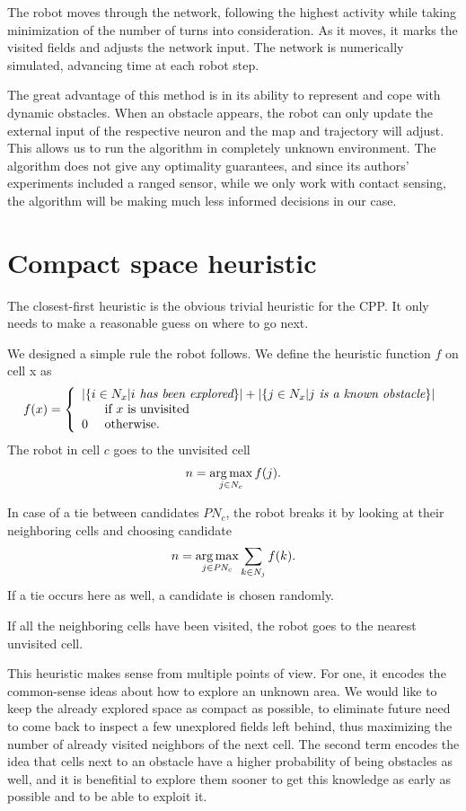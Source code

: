 \documentclass[buriama8_dp.tex]{subfiles}
\begin{document}
The robot moves through the network, following the highest activity while taking minimization of the number of turns into consideration. As it moves, it marks the visited fields and adjusts the network input. The network is numerically simulated, advancing time at each robot step.

The great advantage of this method is in its ability to represent and cope with dynamic obstacles. When an obstacle appears, the robot can only update the external input of the respective neuron and the map and trajectory will adjust. This allows us to run the algorithm in completely unknown environment. The algorithm does not give any optimality guarantees, and since its authors' experiments included a ranged sensor, while we only work with contact sensing, the algorithm will be making much less informed decisions in our case.

\section{Compact space heuristic}
\label{sec:my_heuristic}

The closest-first heuristic is the obvious trivial heuristic for the CPP. It only needs to make a reasonable guess on where to go next. 

We designed a simple rule the robot follows. We define the heuristic function \(f\) on cell \m x as 
\[
f(x)= \left\{
    \begin{array}{l}
      |\{i \in N_x | i \textit{ has been explored}\}| + |\{j \in N_x | j \textit{ is a known obstacle}\}| \\
      \hphantom{0} \quad \textrm{ if }x\textrm{ is unvisited} \\
      0 \quad \textrm{ otherwise.}
    \end{array}
    \right.
\]
The robot in cell \(c\) goes to the unvisited cell
\[n = \operatorname*{arg\,max}_{j \in N_c} f(j).\]

In case of a tie between candidates \(\textit{PN}_c\), the robot breaks it by looking at their neighboring cells and choosing candidate
\[
n = \operatorname*{arg\,max}_{j \in \textit{PN}_c} \sum_{k \in N_j} f(k).
\]
If a tie occurs here as well, a candidate is chosen randomly.

If all the neighboring cells have been visited, the robot goes to the nearest unvisited cell.

This heuristic makes sense from multiple points of view. For one, it encodes the common-sense ideas about how to explore an unknown area. We would like to keep the already explored space as compact as possible, to eliminate future need to come back to inspect a few unexplored fields left behind, thus maximizing the number of already visited neighbors of the next cell. The second term encodes the idea that cells next to an obstacle have a higher probability of being obstacles as well, and it is benefitial to explore them sooner to get this knowledge as early as possible and to be able to exploit it.
\end{document}
